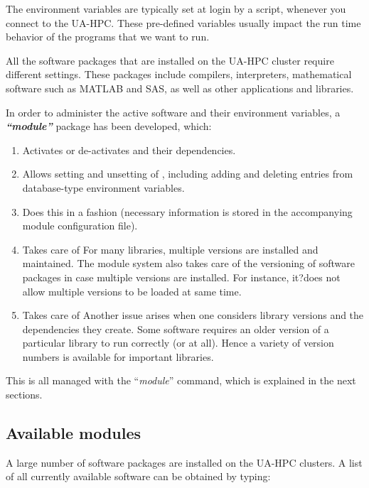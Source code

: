 The environment variables are typically set at login by a script, whenever you connect to the UA-HPC. These pre-defined variables usually impact the run time behavior of the programs that we want to run.

All the software packages that are installed on the UA-HPC cluster require different settings. These packages include compilers, interpreters, mathematical software such as MATLAB and SAS, as well as other applications and libraries.

In order to administer the active software and their environment variables, a \textbf{\textit{``module''}} package has been developed, which:

\begin{enumerate}
\item  Activates or de-activates  and their dependencies.
\item  Allows setting and unsetting of , including adding and deleting entries from database-type environment variables.
\item  Does this in a  fashion (necessary information is stored in the accompanying module configuration file).
\item  Takes care of For many libraries, multiple versions are installed and maintained. The module system also takes care of the versioning of software packages in case multiple versions are installed. For instance, it?does not allow multiple versions to be loaded at same time.
\item  Takes care of Another issue arises when one considers library versions and the dependencies they create. Some software requires an older version of a particular library to run correctly (or at all). Hence a variety of version numbers is available for important libraries.
\end{enumerate}


This is all managed with the ``\textit{module}'' command, which is explained in the next sections.

\subsection{Available modules}

A large number of software packages are installed on the UA-HPC clusters. A list of all currently available software can be obtained by typing:

